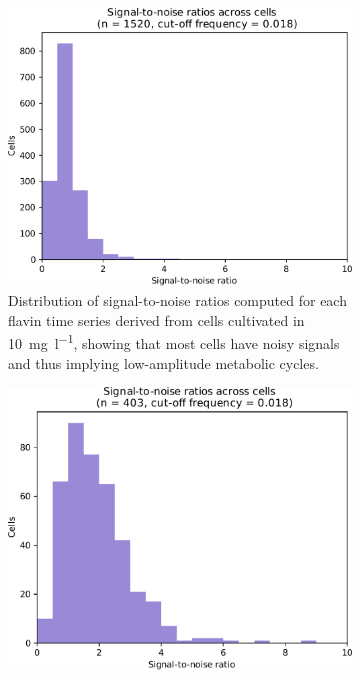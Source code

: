 \begin{figure}
  \begin{subfigure}[t]{0.3\textwidth}
   \centering
   \includegraphics[width=\textwidth]{limiting_snr_edit.pdf}
   \caption{
     Distribution of signal-to-noise ratios computed for each flavin time series derived from cells cultivated in \SI{10}{\milli\gram~\litre^{-1}}, showing that most cells have noisy signals and thus implying low-amplitude metabolic cycles.
   }
   \label{fig:biology-lowglc-snr}
  \end{subfigure}%
  \begin{subfigure}[t]{0.3\textwidth}
   \centering
   \includegraphics[width=\textwidth]{pyruvate_snr_edit.pdf}

\end{subfigure}
\end{figure}
